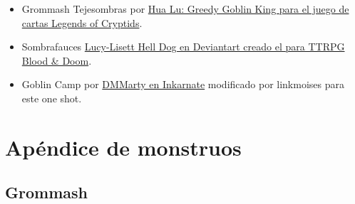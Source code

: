 \documentclass[10pt,twoside,twocolumn,openany]{dndbook}
\begin{document}
\begin{itemize}
  \item Grommash Tejesombras por \href{https://legendofthecryptids.fandom.com/wiki/Greedy_Goblin_King}{Hua Lu: Greedy Goblin King para el juego de cartas Legends of Cryptids}.
  \item Sombrafauces \href{https://www.deviantart.com/lucy-lisett/art/Death-Dog-901248620}{Lucy-Lisett Hell Dog en Deviantart creado el para TTRPG Blood \& Doom}.
  \item Goblin Camp por \href{https://inkarnate.com/m/zkNwn5--goblin-camp/}{DMMarty en Inkarnate} modificado por linkmoises para este one shot.
\end{itemize}

\part*{Apéndice de monstruos}

\chapter*{Grommash}


\end{document}
